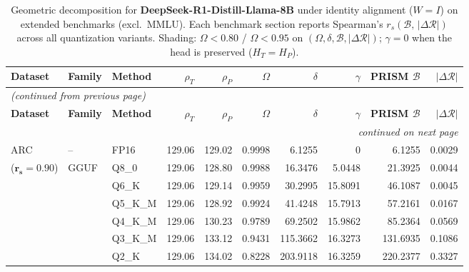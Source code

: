 \begingroup
\small
\setlength{\tabcolsep}{4pt}
\renewcommand{\arraystretch}{1.05}
\setlength{\LTcapwidth}{\textwidth}
\begin{longtable}{ll l rrrrrrr}
\caption{Geometric decomposition for \textbf{DeepSeek-R1-Distill-Llama-8B} under identity alignment ($W{=}I$) on extended benchmarks (excl.\ MMLU). Each benchmark section reports Spearman's $r_s(\mathcal{B},\,|\Delta\mathcal{R}|)$ across all quantization variants. Shading: \colorbox{red!35}{$\Omega{<}0.80$} / \colorbox{red!18}{$\Omega{<}0.95$} on $(\Omega,\delta,\mathcal{B},|\Delta\mathcal{R}|)$; \colorbox{cyan!12}{$\gamma{=}0$} when the head is preserved ($H_T{=}H_P$).}\label{tab:deepseek_decomposition_ext_bound}\\
\toprule
\textbf{Dataset} & \textbf{Family} & \textbf{Method} & \textbf{$\rho_T$} & \textbf{$\rho_P$} & \textbf{$\Omega$} & \textbf{$\delta$} & \textbf{$\gamma$} & \textbf{PRISM $\mathcal{B}$} & \textbf{$|\Delta\mathcal{R}|$} \\
\midrule
\endfirsthead
\multicolumn{10}{l}{\small\itshape (continued from previous page)}\\
\toprule
\textbf{Dataset} & \textbf{Family} & \textbf{Method} & \textbf{$\rho_T$} & \textbf{$\rho_P$} & \textbf{$\Omega$} & \textbf{$\delta$} & \textbf{$\gamma$} & \textbf{PRISM $\mathcal{B}$} & \textbf{$|\Delta\mathcal{R}|$} \\
\midrule
\endhead
\midrule
\multicolumn{10}{r}{\small\itshape continued on next page}\\
\endfoot
\bottomrule
\endlastfoot
ARC & -- & FP16 & 129.06 & 129.02 & 0.9998 & 6.1255 & \cellcolor{cyan!12} $0$ & 6.1255 & 0.0029 \\
{\small ($\mathbf{r_s{=}0.90}$)} & GGUF & Q8\_0 & 129.06 & 128.80 & 0.9988 & 16.3476 & 5.0448 & 21.3925 & 0.0044 \\
 &  & Q6\_K & 129.06 & 129.14 & 0.9959 & 30.2995 & 15.8091 & 46.1087 & 0.0045 \\
 &  & Q5\_K\_M & 129.06 & 128.92 & 0.9924 & 41.4248 & 15.7913 & 57.2161 & 0.0167 \\
 &  & Q4\_K\_M & 129.06 & 130.23 & 0.9789 & 69.2502 & 15.9862 & 85.2364 & 0.0569 \\
 &  & Q3\_K\_M & 129.06 & 133.12 & \cellcolor{red!18} 0.9431 & \cellcolor{red!18} 115.3662 & 16.3273 & \cellcolor{red!18} 131.6935 & \cellcolor{red!18} 0.1086 \\
 &  & Q2\_K & 129.06 & 134.02 & \cellcolor{red!18} 0.8228 & \cellcolor{red!18} 203.9118 & 16.3259 & \cellcolor{red!18} 220.2377 & \cellcolor{red!18} 0.3327 \\

\end{longtable}

